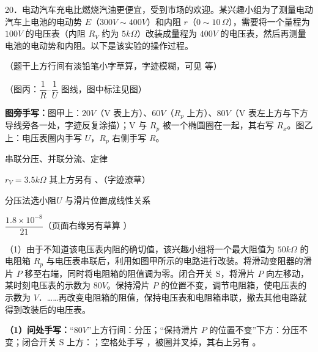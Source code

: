\begin{problem}[粘贴印刷题 20]
20．电动汽车充电比燃烧汽油更便宜，受到市场的欢迎。某兴趣小组为了测量电动汽车上电池的电动势 $E$（$300\unit{V}\sim400\unit{V}$）和内阻 $r$（$0\sim10\,\Omega$），需要将一个量程为 $100\unit{V}$ 的电压表（内阻 $R_V$ 约为 $5\unit{k\Omega}$）改装成量程为 $400\unit{V}$ 的电压表，然后再测量电池的电动势和内阻。以下是该实验的操作过程。

\noindent（题干上方行间有淡铅笔小字草算，字迹模糊，可见  等）




（图丙：$\dfrac1R$--$\dfrac1U$ 图线，图中标注见图）

\noindent\textbf{图旁手写：}图甲上：$20\unit{V}$（V 表上方）、$60\unit{V}$（$R_p$ 上方）、$80\unit{V}$（V 表左上方与下方导线旁各一处，字迹反复涂描）；V 与 $R_p$ 被一个椭圆圈在一起，其右写 $R_x$。图乙上：电压表圈内手写 $U$，$R_p$ 右侧手写 $R$。

串联分压、并联分流、定律%

$r_V=3.5\unit{k\Omega}$%
\quad 其上方另有 、（字迹潦草）

分压法选小阻\quad $U$ 与滑片位置成线性关系

$\dfrac{1.8\times10^{-8}}{21}$\quad {}\quad（页面右缘另有草算 ）

（1）由于不知道该电压表内阻的确切值，该兴趣小组将一个最大阻值为 $50\unit{k\Omega}$ 的电阻箱 $R_p$ 与电压表串联后，利用如图甲所示的电路进行改装。将滑动变阻器的滑片 $P$ 移至右端，同时将电阻箱的阻值调为零。闭合开关 S，将滑片 $P$ 向左移动，某时刻电压表的示数为 $80\unit{V}$。保持滑片 $P$ 的位置不变，调节电阻箱，使电压表的示数为 \underline{\hspace{2.5em}} $\unit{V}$．……再改变电阻箱的阻值，保持电压表和电阻箱串联，撤去其他电路就得到改装后的电压表。%

\noindent\textbf{（1）问处手写：}“$80\unit{V}$”上方行间：分压；“保持滑片 $P$ 的位置不变”下方：分压不变；闭合开关 S 上方：；空格处手写 ，被圈并叉掉，其右上另有 。


\end{problem}
